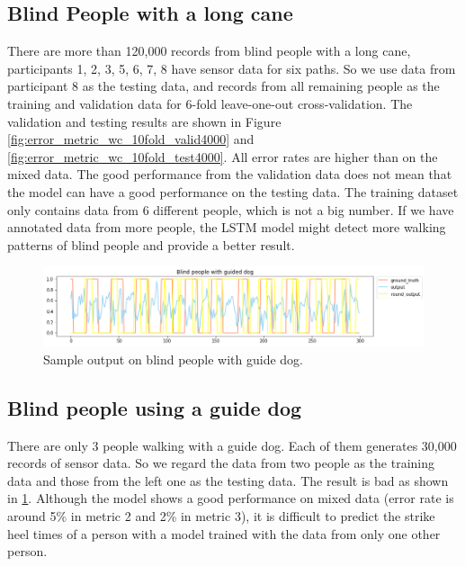 \documentclass[11pt]{article}
\begin{document}
\subsection{Blind People with a long cane}
There are more than 120,000 records from blind people with a long cane, participants 1, 2, 3, 5, 6, 7, 8 have sensor data for six paths. So we use data from participant 8 as the testing data, and records from all remaining people as the training and validation data for 6-fold leave-one-out cross-validation. The validation and testing results are shown in Figure \ref{fig:error_metric_wc_10fold_valid4000} and \ref{fig:error_metric_wc_10fold_test4000}. All error rates are higher than on the mixed data. The good performance from the validation data does not mean that the model can have a good performance on the testing data.
The training dataset only contains data from 6 different people, which is not a big number. If we have annotated data from more people, the LSTM model might detect more walking patterns of blind people and provide a better result.

\begin{figure}[ht]
\centering
\includegraphics[scale=0.5]{blind_gd}
\caption{Sample output on blind people with guide dog.}
\label{fig:blind_gd}
\end{figure}


\subsection{Blind people using a guide dog}

There are only 3 people walking with a guide dog. Each of them generates 30,000 records of sensor data. So we regard the data from two people as the training data and those from the left one as the testing data. The result is bad as shown in \ref{fig:blind_gd}. Although the model shows a  good performance on mixed data (error rate is around 5\% in metric 2 and 2\% in metric 3), it is difficult to predict the strike heel times of a person with a model trained with the data from only one other person.
\end{document}
